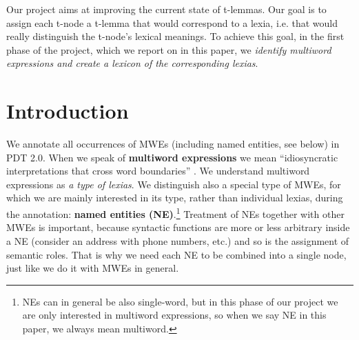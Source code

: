 \documentclass[11pt]{article}
\begin{document}
Our project aims at improving the current state of t-lemmas. Our goal is to assign each t-node a t-lemma that would correspond to a lexia, i.e. that would really distinguish the t-node's lexical meanings. To achieve this goal, in the first phase of the project, which we report on in this paper, we \textit{identify multiword expressions and create a lexicon of the corresponding lexias}. 






\section{Introduction}
\label{sec:intro}
We annotate all occurrences of MWEs (including named entities, see below) in PDT 2.0. 
When we speak of {\bf multiword expressions} we mean ``idiosyncratic interpretations that cross word boundaries'' \newline\cite{sag:2002}. We understand multiword expressions as \textit{a type of lexias}.
We distinguish also a special type of MWEs, for which we are mainly interested in its type, rather than individual lexias, during the annotation: {\bf named entities (NE)}.\footnote{NEs can in general be also single-word, but in this phase of our project we are only interested in multiword expressions, so when we say NE in this paper, we always mean multiword.} 
%
Treatment of NEs together with other MWEs is important, because syntactic functions
are more or less arbitrary inside a NE (consider an address with phone numbers, etc.) and so is the assignment of semantic roles.
That is why we need each NE to be combined into a single node, just like we do it with MWEs in general. 
\end{document}
